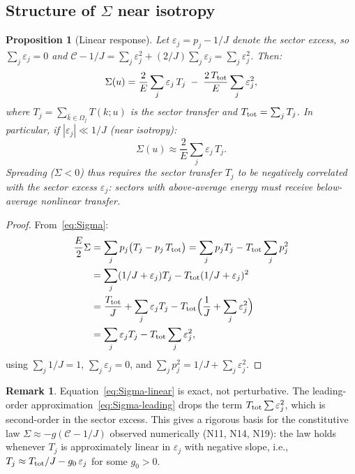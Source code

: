 \documentclass[11pt]{article}
\newtheorem{proposition}[theorem]{Proposition}
\theoremstyle{definition}
\newtheorem{remark}[theorem]{Remark}
\newcommand{\cC}{\mathcal{C}}
\begin{document}
\subsection{Structure of $\Sigma$ near isotropy}

\begin{proposition}[Linear response]
\label{prop:linear-response}
Let $\varepsilon_j = p_j - 1/J$ denote the sector
excess, so $\sum_j\varepsilon_j = 0$ and
$\cC - 1/J = \sum_j\varepsilon_j^2 + (2/J)\sum_j\varepsilon_j
= \sum_j\varepsilon_j^2$.
Then:
\begin{equation}\label{eq:Sigma-linear}
\Sigma(u) = \frac{2}{E}\sum_j \varepsilon_j\, T_j
\;-\; \frac{2\,T_{\rm tot}}{E}\sum_j\varepsilon_j^2,
\end{equation}
where $T_j = \sum_{\hat k\in\Omega_j}T(k;u)$ is the
sector transfer and
$T_{\rm tot} = \sum_j T_j$.  In particular, if
$|\varepsilon_j|\ll 1/J$ (near isotropy):
\begin{equation}\label{eq:Sigma-leading}
\Sigma(u) \approx \frac{2}{E}
\sum_j \varepsilon_j\, T_j.
\end{equation}
Spreading ($\Sigma<0$) thus requires the sector transfer
$T_j$ to be negatively correlated with the sector excess
$\varepsilon_j$: sectors with above-average energy must
receive below-average nonlinear transfer.
\end{proposition}

\begin{proof}
From~\eqref{eq:Sigma}:
\begin{align}
\frac{E}{2}\Sigma
&= \sum_j p_j\bigl(T_j - p_j\,T_{\rm tot}\bigr)
= \sum_j p_j T_j - T_{\rm tot}\sum_j p_j^2
\notag\\
&= \sum_j (1/J+\varepsilon_j)T_j
  - T_{\rm tot}(1/J+\varepsilon_j)^2 \notag\\
&= \frac{T_{\rm tot}}{J} + \sum_j\varepsilon_j T_j
  - T_{\rm tot}\Bigl(\frac{1}{J}
  +\sum_j\varepsilon_j^2\Bigr) \notag\\
&= \sum_j\varepsilon_j T_j
  - T_{\rm tot}\sum_j\varepsilon_j^2,
\end{align}
using $\sum_j 1/J = 1$, $\sum_j\varepsilon_j = 0$,
and $\sum_j p_j^2 = 1/J + \sum_j\varepsilon_j^2$.
\end{proof}

\begin{remark}
\label{rem:constitutive-form}
Equation~\eqref{eq:Sigma-linear} is exact, not
perturbative.  The leading-order
approximation~\eqref{eq:Sigma-leading} drops the
term $T_{\rm tot}\sum\varepsilon_j^2$, which is
second-order in the sector excess.
This gives a rigorous basis for the constitutive
law $\Sigma \approx -g(\cC-1/J)$ observed
numerically (N11, N14, N19): the law holds whenever
$T_j$ is approximately linear in $\varepsilon_j$
with negative slope, i.e.,
$T_j \approx T_{\rm tot}/J - g_0\,\varepsilon_j$
for some $g_0>0$.
\end{remark}
\end{document}
